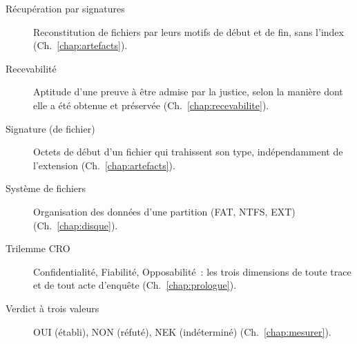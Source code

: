 \begin{description}
    \item[Récupération par signatures] Reconstitution de fichiers par leurs motifs de début et de fin, sans l'index (Ch.~\ref{chap:artefacts}).
    \item[Recevabilité] Aptitude d'une preuve à être admise par la justice, selon la manière dont elle a été obtenue et préservée (Ch.~\ref{chap:recevabilite}).
    \item[Signature (de fichier)] Octets de début d'un fichier qui trahissent son type, indépendamment de l'extension (Ch.~\ref{chap:artefacts}).
    \item[Système de fichiers] Organisation des données d'une partition (FAT, NTFS, EXT) (Ch.~\ref{chap:disque}).
    \item[Trilemme CRO] Confidentialité, Fiabilité, Opposabilité~: les trois dimensions de toute trace et de tout acte d'enquête (Ch.~\ref{chap:prologue}).
    \item[Verdict à trois valeurs] OUI (établi), NON (réfuté), NEK (indéterminé) (Ch.~\ref{chap:mesurer}).
\end{description}
